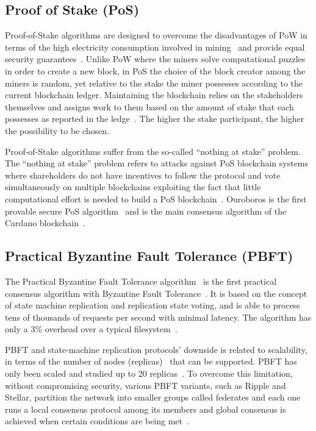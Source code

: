 \subsection{Proof of Stake (PoS)}\label{blockchain:consensus:pos}

Proof-of-Stake algorithms are designed to overcome the disadvantages of PoW in terms of the high electricity consumption involved in mining~\cite{bl_consensus}
and provide equal security guarantees~\cite{Kiayias2017}. Unlike PoW where the miners solve computational puzzles in order to create a new block, in PoS the choice
of the block creator among the miners is random, yet relative to the stake the miner possesses according to the current blockchain ledger. Maintaining
the blockchain relies on the stakeholders themselves and assigns work to them based on the amount of stake that each possesses as reported in the ledge~\cite{Kiayias2017}.
The higher the stake participant, the higher the possibility to be chosen.

Proof-of-Stake algorithms suffer from the so-called “nothing at stake” problem.
The “nothing at stake” problem refers to attacks against PoS blockchain systems where shareholders do not have
incentives to follow the protocol and vote simultaneously on multiple blockchains exploiting the fact that little computational effort
is needed to build a PoS blockchain~\cite{Kiayias2017}. Ouroboros is the first provable secure PoS algorithm~\cite{Kiayias2017} and is the main consensus algorithm of the Cardano blockchain~\cite{cardano_site}.

\subsection{Practical Byzantine Fault Tolerance (PBFT)}\label{blockchain:consensus:PBFT}

The Practical Byzantine Fault Tolerance algorithm~\cite{Castro:1999:PBF:296806.296824} is the first practical consensus algorithm with Byzantine Fault Tolerance~\cite{byzantine_fault_tolerance}.
It is based on the concept of state machine replication and replication state voting, and is able to process tens of thousands of requests per second with minimal latency.
The algorithm has only a 3\% overhead over a typical filesystem~\cite{Castro:1999:PBF:296806.296824}.

PBFT and state-machine replication protocols’ downside is related to scalability, in terms of the number of nodes (replicas)~\cite{Vukolić2016} that can be supported.
PBFT has only been scaled and studied up to 20 replicas~\cite{bl_consensus,Vukolić2016}. To overcome this limitation, without compromising security, various PBFT variants,
such as Ripple and Stellar, partition the network into smaller groups called federates and each one runs a local consensus protocol among its members and
global consensus is achieved when certain conditions are being met~\cite{DBLP:journals/corr/abs-1708-05665}.

